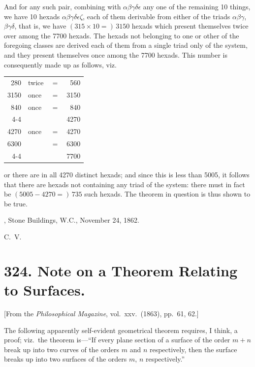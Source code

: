 \documentclass[11pt,a4paper]{article}
\theoremstyle{plain}
\begin{document}
\newpage
And for any such pair, combining with $\alpha\beta\gamma\delta\epsilon$ any one of the remaining 10 things, we have 10 hexads $\alpha\beta\gamma\delta\epsilon\zeta$, each of them derivable from either of the triads $\alpha\beta\gamma$, $\beta\gamma\delta$, that is, we have $(315 \times 10 =)\, 3150$ hexads which present themselves twice over among the 7700 hexads. The hexads not belonging to one or other of the foregoing classes are derived each of them from a single triad only of the system, and they present themselves once among the 7700 hexads. This number is consequently made up as follows, viz.
\begin{center}
\begin{tabular}{r@{ hexads each }l@{ }r@{ }r}
280 & twice & $=$ & 560 \\
3150 & once & $=$ & 3150 \\
840 & once & $=$ & 840 \\ \cline{4-4}
& & & 4270 \\
4270 & once & $=$ & 4270 \\
6300 & & $=$ & 6300 \\ \cline{4-4}
& & & 7700 \\
\end{tabular}
\end{center}
or there are in all 4270 distinct hexads; and since this is less than 5005, it follows that there are hexads not containing any triad of the system: there must in fact be $(5005 - 4270 =)\, 735$ such hexads. The theorem in question is thus shown to be true.

\medskip
{}, Stone Buildings, W.C., November 24, 1862.

\noindent C.\ V.


\newpage
\section*{324. Note on a Theorem Relating to Surfaces.}

[From the \textit{Philosophical Magazine}, vol.\ xxv.\ (1863), pp.\ 61, 62.]

\medskip

The following apparently self-evident geometrical theorem requires, I think, a proof; viz.\ the theorem is---``If every plane section of a surface of the order $m+n$ break up into two curves of the orders $m$ and $n$ respectively, then the surface breaks up into two surfaces of the orders $m$, $n$ respectively.''
\end{document}
